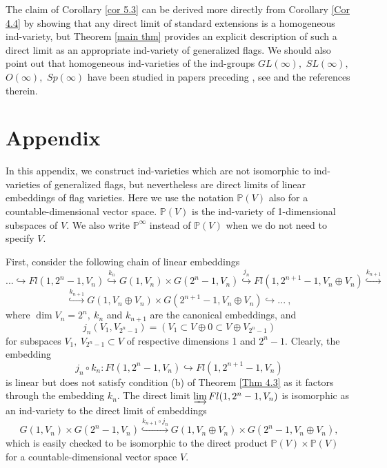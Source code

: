 \documentclass[12pt]{amsart}
\theoremstyle{definition}
\begin{document}
The claim of Corollary \ref{cor 5.3} can be derived more 
directly from Corollary \ref{Cor 4.4} by showing that any 
direct limit of standard extensions is a homogeneous 
ind-variety, but Theorem \ref{main thm} provides an explicit 
description of such a direct limit as an appropriate 
ind-variety of generalized flags. We should also point out that
homogeneous ind-varieties of the ind-groups $GL(\infty),$ $SL(\infty),$ $O(\infty),$ $Sp(\infty)$ have been studied in papers preceding \cite{DP}, see \cite{DPW} and the references
therein.


\vspace{1cm}
\section{Appendix}\label{special}
\vspace{5mm}

In this appendix, we construct ind-varieties which are not 
isomorphic to ind-varieties of generalized flags, but 
nevertheless are direct limits of linear embeddings of flag 
varieties. Here we use the notation $\mathbb{P}(V)$ also for a
countable-dimensional vector space. $\mathbb{P}(V)$ is the 
ind-variety of 1-dimensional subspaces of $V$. We also write 
$\mathbb{P}^{\infty}$ instead of $\mathbb{P}(V)$ when we do 
not need to specify $V$.

First, consider the following chain of linear embeddings
$$
...\hookrightarrow Fl(1,2^n-1,V_n)\overset{k_n}
{\hookrightarrow}G(1,V_n)\times G(2^n-1,V_n)\overset{j_n}
{\hookrightarrow}Fl(1,2^{n+1}-1,V_n\oplus V_n)\overset{k_{n+1}}
{\hookrightarrow}
$$
$$
\overset{k_{n+1}}{\hookrightarrow}G(1,V_n\oplus V_n)
\times G(2^{n+1}-1,V_n\oplus V_n)\hookrightarrow...\ ,
$$
where $\dim V_n=2^n,\ k_n$ and $k_{n+1}$ are the canonical 
embeddings, and $$j_n(V_1,V_{2^n-1})=(V_1\subset V\oplus0\subset V\oplus V_{2^n-1})$$ for subspaces $V_1,\ 
V_{2^n-1}\subset V$ of respective dimensions 1 and $2^n-1$. Clearly, the embedding
$$
j_n\circ k_n:Fl(1,2^n-1,V_n)\hookrightarrow Fl(1,2^{n+1}-1,V_n)
$$
is linear but does not satisfy condition (b) of Theorem 
\ref{Thm 4.3} as it factors through the embedding $k_n$. The 
direct limit $\varinjlim Fl(1,2^n-1,V_n)$ is isomorphic as an 
ind-variety to the direct limit of embeddings
$$
G(1,V_n)\times G(2^n-1,V_n)\overset{k_{n+1}\circ j_n}
{\hookrightarrow}G(1,V_n\oplus V_n)\times G(2^n-1,V_n\oplus 
V_n),
$$
which is easily checked to be isomorphic to the direct product
$\mathbb{P}(V)\times\mathbb{P}(V)$ for a countable-dimensional
vector space $V$. 
\end{document}

